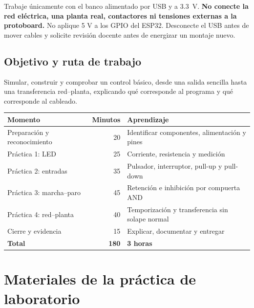 \documentclass[11pt,a4paper]{article}
\begin{document}
\begin{seguridad}
Trabaje únicamente con el banco alimentado por USB y a \SI{3,3}{V}. \textbf{No conecte la red eléctrica, una planta real, contactores ni tensiones externas a la protoboard.} No aplique 5 V a los GPIO del ESP32. Desconecte el USB antes de mover cables y solicite revisión docente antes de energizar un montaje nuevo.
\end{seguridad}

\subsection*{Objetivo y ruta de trabajo}
Simular, construir y comprobar un control básico, desde una salida sencilla hasta una transferencia red--planta, explicando qué corresponde al programa y qué corresponde al cableado.

\begin{center}\small
\begin{tabularx}{\linewidth}{@{}X r X@{}}
\toprule
\textbf{Momento} & \textbf{Minutos} & \textbf{Aprendizaje}\tabularnewline\midrule
Preparación y reconocimiento & 20 & Identificar componentes, alimentación y pines\\
Práctica 1: LED & 25 & Corriente, resistencia y medición\\
Práctica 2: entradas & 35 & Pulsador, interruptor, pull-up y pull-down\\
Práctica 3: marcha--paro & 45 & Retención e inhibición por compuerta AND\\
Práctica 4: red--planta & 40 & Temporización y transferencia sin solape normal\\
Cierre y evidencia & 15 & Explicar, documentar y entregar\\\midrule
\textbf{Total} & \textbf{180} & \textbf{3 horas}\\\bottomrule
\end{tabularx}
\end{center}

\section*{Materiales de la práctica de laboratorio}
\end{document}
